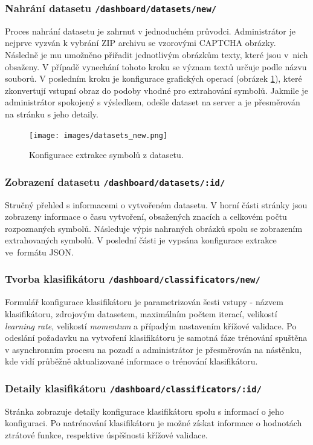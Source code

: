 \documentclass[
  field=ainfp,
  master=true,
  biblatex,
  sourcecodes=false,
  theorems=false,
  glossaries,
  index
]{kidiplom}
\begin{document}
\subsubsection*{Nahrání datasetu \texttt{/dashboard/datasets/new/}}
Proces nahrání datasetu je zahrnut v jednoduchém průvodci. Administrátor je nejprve vyzván k vybrání ZIP archivu se vzorovými CAPTCHA obrázky. Následně je mu umožněno přiřadit jednotlivým obrázkům texty, které jsou v~nich obsaženy. V případě vynechání tohoto kroku se význam textů určuje podle názvu souborů. V posledním kroku je konfigurace grafických operací (obrázek \ref{fig:dataset_new}), které zkonvertují vstupní obraz do podoby vhodné pro extrahování symbolů. Jakmile je administrátor spokojený s výsledkem, odešle dataset na server a je přesměrován na stránku s jeho detaily.

\begin{figure}[h]
  \centering
  \texttt{[image: images/datasets\_new.png]}
  \caption{Konfigurace extrakce symbolů z datasetu.}
  \label{fig:dataset_new}
\end{figure}

\subsubsection*{Zobrazení datasetu \texttt{/dashboard/datasets/:id/}}
Stručný přehled s informacemi o vytvořeném datasetu. V horní části stránky jsou zobrazeny informace o času vytvoření, obsažených znacích a celkovém počtu rozpoznaných symbolů. Následuje výpis nahraných obrázků spolu se zobrazením extrahovaných symbolů. V poslední části je vypsána konfigurace extrakce ve~formátu JSON. 

\subsubsection*{Tvorba klasifikátoru \texttt{/dashboard/classificators/new/}}
Formulář konfigurace klasifikátoru je parametrizován šesti vstupy - názvem klasifikátoru, zdrojovým datasetem, maximálním počtem iterací, velikostí \textit{learning rate}, velikostí \textit{momentum} a případým nastavením křížové validace. Po odeslání požadavku na vytvoření klasifikátoru je samotná fáze trénování spuštěna v asynchronním procesu na pozadí a administrátor je přesměrován na nástěnku, kde vidí průběžně aktualizované informace o trénování klasifikátoru.

\subsubsection*{Detaily klasifikátoru \texttt{/dashboard/classificators/:id/}}
Stránka zobrazuje detaily konfigurace klasifikátoru spolu s informací o jeho konfiguraci. Po natrénování klasifikátoru je možné získat informace o hodnotách ztrátové funkce, respektive úspěšnosti křížové validace.
\end{document}
